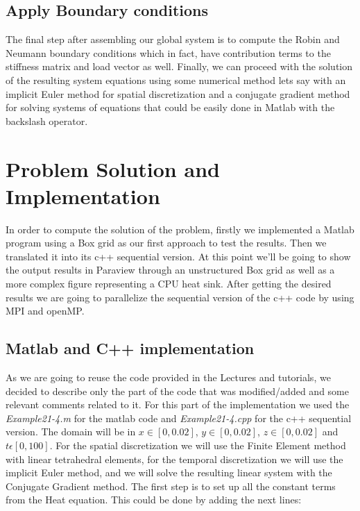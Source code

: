 \documentclass[12pt]{article}
\begin{document}
\subsection{Apply Boundary conditions}

The final step after assembling our global system is to compute the Robin and Neumann boundary conditions which in fact, have contribution terms to the stiffness matrix and load vector as well. Finally, we can proceed with the solution of the resulting system equations using some numerical method lets say with an implicit Euler method for spatial discretization and a conjugate gradient method for solving systems of equations that could be easily done in Matlab with the backslash operator.

\section{Problem Solution and Implementation}

In order to compute the solution of the problem, firstly we implemented a Matlab program using a Box grid as our first approach to test the results. Then we translated it into its c++ sequential version. At this point we'll be going to show the output results in Paraview through an unstructured Box grid as well as a more complex figure representing a CPU heat sink. After getting the desired results we are going to parallelize the sequential version of the c++ code by using MPI and openMP.

\subsection{Matlab and C++ implementation}
As we are going to reuse the code provided in the Lectures and tutorials, we decided to describe only the part of the code that was modified/added and some relevant comments related to it. For this part of the implementation we used the \textit{Example21-4.m} for the matlab code and \textit{Example21-4.cpp} for the c++ sequential version. The domain will be in $x\in[0,0.02]$, $y\in[0,0.02]$, $z\in[0,0.02]$ and $t\epsilon[0,100]$. For the spatial discretization we will use the Finite Element method with linear tetrahedral elements, for the temporal discretization we will use the implicit Euler method, and we will solve the resulting linear system with the Conjugate Gradient method. The first step is to set up all the constant terms from the Heat equation. This could be done by adding the next lines:
\end{document}
